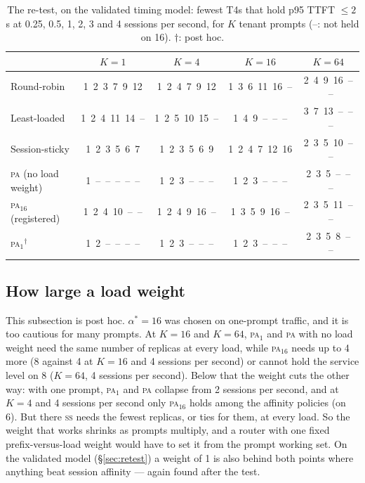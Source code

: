 \documentclass[10pt,twocolumn]{article}
\newcommand{\PA}{\textsc{pa}}
\newcommand{\SSt}{\textsc{ss}}
\newcommand{\miss}{--}
\begin{document}
\begin{table}[t]
\centering\small
\caption{The re-test, on the validated timing model: fewest T4s that hold p95 TTFT $\le 2$\,s at
0.25, 0.5, 1, 2, 3 and 4 sessions per second, for $K$ tenant prompts (\miss: not held on 16).
$\dagger$: post hoc.}
\label{tab:retest}
\begin{tabular}{@{}lcccc@{}}
\toprule
& $K = 1$ & $K = 4$ & $K = 16$ & $K = 64$ \\
\midrule
Round-robin            & 1\ 2\ 3\ 7\ 9\ 12 & 1\ 2\ 4\ 7\ 9\ 12 & 1\ 3\ 6\ 11\ 16\ \miss & 2\ 4\ 9\ 16\ \miss\ \miss \\
Least-loaded           & 1\ 2\ 4\ 11\ 14\ \miss & 1\ 2\ 5\ 10\ 15\ \miss & 1\ 4\ 9\ \miss\ \miss\ \miss & 3\ 7\ 13\ \miss\ \miss\ \miss \\
Session-sticky         & 1\ 2\ 3\ 5\ 6\ 7 & 1\ 2\ 3\ 5\ 6\ 9 & 1\ 2\ 4\ 7\ 12\ 16 & 2\ 3\ 5\ 10\ \miss\ \miss \\
\PA{} (no load weight) & 1\ \miss\ \miss\ \miss\ \miss\ \miss & 1\ 2\ 3\ \miss\ \miss\ \miss & 1\ 2\ 3\ \miss\ \miss\ \miss & 2\ 3\ 5\ \miss\ \miss\ \miss \\
\PA$_{16}$ (registered) & 1\ 2\ 4\ 10\ \miss\ \miss & 1\ 2\ 4\ 9\ 16\ \miss & 1\ 3\ 5\ 9\ 16\ \miss & 2\ 3\ 5\ 11\ \miss\ \miss \\
\PA$_{1}{}^{\dagger}$  & 1\ 2\ \miss\ \miss\ \miss\ \miss & 1\ 2\ 3\ \miss\ \miss\ \miss & 1\ 2\ 3\ \miss\ \miss\ \miss & 2\ 3\ 5\ 8\ \miss\ \miss \\
\bottomrule
\end{tabular}
\end{table}

\subsection{How large a load weight}\label{sec:alpha}

This subsection is post hoc. $\alpha^* = 16$ was chosen on one-prompt traffic, and it is too cautious
for many prompts. At $K = 16$ and $K = 64$, \PA$_1$ and \PA{} with no load weight need the same number
of replicas at every load, while \PA$_{16}$ needs up to 4 more (8 against 4 at $K = 16$ and 4 sessions
per second) or cannot hold the service level on 8 ($K = 64$, 4 sessions per second). Below that the
weight cuts the other way: with one prompt, \PA$_1$ and \PA{} collapse from 2 sessions per second, and
at $K = 4$ and 4 sessions per second only \PA$_{16}$ holds among the affinity policies (on 6). But
there \SSt{} needs the fewest replicas, or ties for them, at every load. So the weight that works
shrinks as prompts multiply, and a router with one fixed prefix-versus-load weight would have to set
it from the prompt working set. On the validated model (\S\ref{sec:retest}) a weight of 1 is also
behind both points where anything beat session affinity --- again found after the test.
\end{document}
